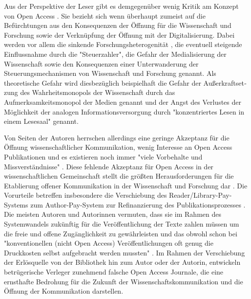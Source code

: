 Aus der Perspektive der Leser gibt es demgegenüber wenig Kritik am Konzept von Open Access \cite{wein_2010_erwerbung} \cite{weishaupt_2009_goldenOA}. Sie bezieht sich wenn überhaupt zumeist auf die Befürchtungen aus den Konsequenzen der Öffnung für die Wissenschaft und Forschung sowie der Verknüpfung der Öffnung mit der Digitalisierung. Dabei werden vor allem die sinkende Forschungsheterogenität \cite{Hirschi_2015_buch_oa}, die eventuell steigende Einflussnahme durch die "Steuerzahler", die Gefahr der Medialisierung der Wissenschaft \cite{weingart_2005_wissenschaft} sowie den Konsequenzen einer Unterwanderung der Steuerungsmechanismen von Wissenschaft und Forschung genannt. Als theoretische Gefahr wird diesbezüglich beispielhaft die Gefahr der Au­ßer­kraft­set­zung des Wahrheitsmonopols der Wissenschaft durch das Aufmerksamkeitsmonopol der Medien genannt \cite{weingart_2005_wissenschaft} und der Angst des Verlustes der Möglichkeit der analogen Informationsversorgung durch "konzentriertes Lesen in einem Lesesaal" \cite{winkler_2011_anforderungen} genannt.

Von Seiten der Autoren herrschen allerdings eine geringe Akzeptanz für die Öffnung wissenschaftlicher Kommunikation, wenig Interesse an Open Access Publikationen und es existieren noch immer "viele Vorbehalte und Missverständnisse" \cite{Suber_2002}. Diese fehlende Akzeptanz für Open Access in der wissenschaftlichen Gemeinschaft stellt die größten Herausforderungen für die Etablierung offener Kommunikation in der Wissenschaft und Forschung dar \cite{weishaupt_2009_goldenOA}. Die Vorurteile betreffen insbesondere die Verschiebung des Reader/Library-Pay-Systems zum Author-Pay-System zur Refinanzierung des Publikationsprozesses \cite{EuropeanCommission_sciencepub_2006} \cite{Chibnik_2015}. Die meisten Autoren und Autorinnen vermuten, dass sie im Rahmen des Systemwandels zukünftig für die Veröffentlichung der Texte zahlen müssen um die freie und offene Zugänglichkeit zu gewährleisten \cite{Mussell_2013} und das obwohl schon bei "konventionellen (nicht Open Access) Veröffentlichungen oft genug die Druckkosten selbst aufgebracht werden mussten" \cite{weishaupt_2009_goldenOA}. Im Rahmen der Verschiebung der Erlösquelle von der Bibliothek hin zum Autor oder der Autorin, entwickeln betrügerische Verleger zunehmend falsche Open Access Journale, die eine ernsthafte Bedrohung für die Zukunft der Wissenschaftskommunikation \cite{Beall_2012} und die Öffnung der Kommunikation darstellen.

